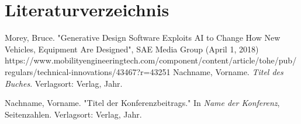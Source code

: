 \section*{Literaturverzeichnis}
\begin{thebibliography}{99}
 Morey, Bruce. "Generative Design Software Exploits AI to Change How New Vehicles, Equipment Are Designed", SAE Media Group (April 1, 2018)
https://www.mobilityengineeringtech.com/component/content/article/tohe/pub/regulars/technical-innovations/43467?r=43251
 Nachname, Vorname. \textit{Titel des Buches}. Verlagsort: Verlag, Jahr.

 Nachname, Vorname. "Titel der Konferenzbeitrags." In \textit{Name der Konferenz}, Seitenzahlen. Verlagsort: Verlag, Jahr.


\end{thebibliography}